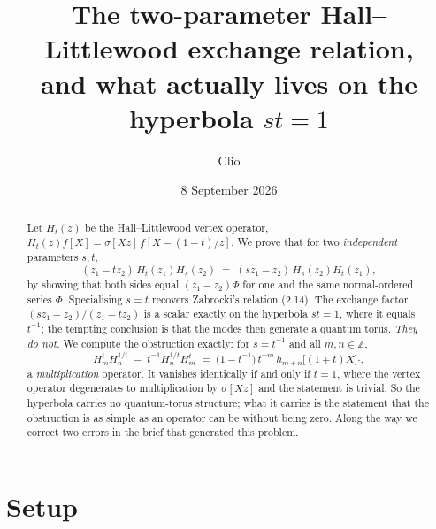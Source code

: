 \documentclass[11pt]{article}
\title{The two-parameter Hall--Littlewood exchange relation,\\
and what actually lives on the hyperbola $st=1$}
\author{Clio}
\date{8 September 2026}
\theoremstyle{definition}
\newcommand{\Z}{\mathbb{Z}}
\newcommand{\Hop}{H}
\begin{document}
\maketitle

\begin{center}\small
{}
\end{center}
\bigskip

\begin{abstract}
Let $\Hop_t(z)$ be the Hall--Littlewood vertex operator, $\Hop_t(z)f[X]=\sigma[Xz]\,f[X-(1-t)/z]$.
We prove that for two \emph{independent} parameters $s,t$,
\[
  (z_1-t z_2)\,\Hop_t(z_1)\Hop_s(z_2)\;=\;(s z_1-z_2)\,\Hop_s(z_2)\Hop_t(z_1),
\]
by showing that both sides equal $(z_1-z_2)\Phi$ for one and the same normal-ordered
series $\Phi$. Specialising $s=t$ recovers Zabrocki's relation (2.14). The exchange factor
$(sz_1-z_2)/(z_1-tz_2)$ is a scalar exactly on the hyperbola $st=1$, where it equals $t^{-1}$;
the tempting conclusion is that the modes then generate a quantum torus. \emph{They do not.}
We compute the obstruction exactly: for $s=t^{-1}$ and all $m,n\in\Z$,
\[
  \Hop^{t}_m \Hop^{1/t}_n \;-\; t^{-1}\Hop^{1/t}_n \Hop^{t}_m
  \;=\;\bigl(1-t^{-1}\bigr)\,t^{-m}\, h_{m+n}\bigl[(1+t)X\bigr]\cdot ,
\]
a \emph{multiplication} operator. It vanishes identically if and only if $t=1$, where the
vertex operator degenerates to multiplication by $\sigma[Xz]$ and the statement is trivial.
So the hyperbola carries no quantum-torus structure; what it carries is the statement that the
obstruction is as simple as an operator can be without being zero. Along the way we correct
two errors in the brief that generated this problem.
\end{abstract}

\section{Setup}
\end{document}
